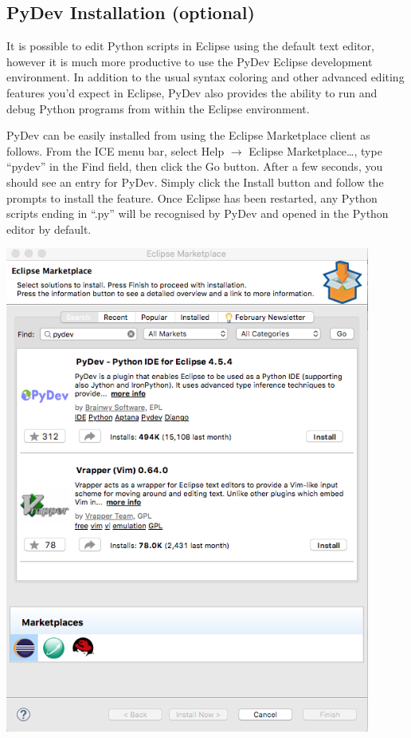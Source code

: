 \documentclass{article}
\begin{document}
\subsection{PyDev Installation (optional)} 

It is possible to edit Python scripts in Eclipse using the default text editor,
however it is much more productive to use the PyDev Eclipse development
environment. In addition to the usual syntax coloring and other advanced editing
features you'd expect in Eclipse, PyDev also provides the ability to run and
debug Python programs from within the Eclipse environment.

PyDev can be easily installed from using the Eclipse Marketplace client as
follows. From the ICE menu bar, select Help $\rightarrow$ Eclipse
Marketplace\ldots, type ``pydev'' in the Find field, then click the Go button.
After a few seconds, you should see an entry for PyDev. Simply click the Install
button and follow the prompts to install the feature. Once Eclipse has been
restarted, any Python scripts ending in ``.py'' will be recognised by
PyDev and opened in the Python editor by default.

\begin{center}
\includegraphics[width=12cm]{images/pydev-marketplace}
\end{center}
\end{document}
